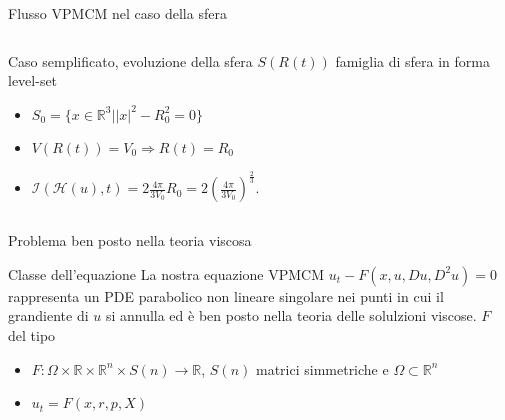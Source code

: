 \begin{frame}{Flusso VPMCM nel caso della sfera}
  \begin{columns}[T]
    \begin{column}{6.5cm}
      \begin{exampleblock}{Caso semplificato, evoluzione della sfera}
        $S(R(t))$ famiglia di sfera in forma level-set
        \begin{itemize}
        \item $S_0=\{x\in\mathbb{R}^3| |x|^2-R_0^2=0\}$
        \item $V(R(t))=V_0\Rightarrow R(t)=R_0$
        \item $\mathcal{I}(\mathcal{H}(u),t)=2\frac{4\pi}{3V_0}R_0=2\left(\frac{4\pi}{3V_0}\right)^\frac{2}{3}$.
        \end{itemize}
      \end{exampleblock}
    \end{column}
    \begin{column}[T]{3.5cm}
      \begin{center}
      \end{center}
  \end{column}
\end{columns}
\end{frame}

\begin{frame}{Problema ben posto nella teoria viscosa}
     \begin{block}{Classe dell'equazione}
       La nostra equazione VPMCM \alert{$u_t-F(x,u,Du,D^2u)=0$}
       rappresenta un PDE parabolico non lineare singolare nei punti in cui
       il grandiente di $u$ si annulla ed è ben posto nella teoria
       delle solulzioni viscose. $F$ del tipo
       \begin{itemize}
         \item $F:\Omega\times\mathbb{R}\times\mathbb{R}^n\times
           S(n)\to\mathbb{R}$, $S(n)$ matrici simmetriche e
           $\Omega\subset\mathbb{R}^n$
         \item $u_t=F(x,r,p,X)$
       \end{itemize}
     \end{block}
\end{frame}

